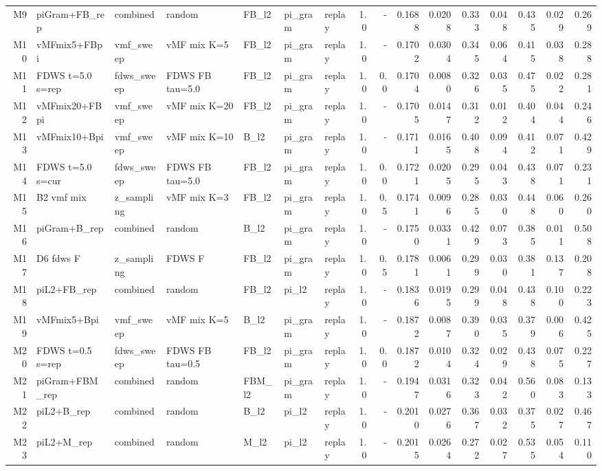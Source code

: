 \documentclass[10pt,landscape]{article}
\begin{document}
\begin{adjustbox}{max width=\textwidth}
\begin{tabular}{rl l l l l l r r rr rr rr r}
M9 & piGram+FB\_rep & combined & random & FB\_l2 & pi\_gram & replay & 1.0 & - & 0.1688 & 0.0208 & 0.333 & 0.048 & 0.435 & 0.029 & 0.269 \\
M10 & vMFmix5+FBpi & vmf\_sweep & vMF mix K=5 & FB\_l2 & pi\_gram & replay & 1.0 & - & 0.1702 & 0.0304 & 0.345 & 0.064 & 0.415 & 0.038 & 0.288 \\
M11 & FDWS t=5.0 s=rep & fdws\_sweep & FDWS FB tau=5.0 & FB\_l2 & pi\_gram & replay & 1.0 & 0.0 & 0.1704 & 0.0080 & 0.326 & 0.035 & 0.475 & 0.022 & 0.281 \\
M12 & vMFmix20+FBpi & vmf\_sweep & vMF mix K=20 & FB\_l2 & pi\_gram & replay & 1.0 & - & 0.1705 & 0.0147 & 0.312 & 0.012 & 0.404 & 0.044 & 0.246 \\
M13 & vMFmix10+Bpi & vmf\_sweep & vMF mix K=10 & B\_l2 & pi\_gram & replay & 1.0 & - & 0.1711 & 0.0165 & 0.408 & 0.094 & 0.412 & 0.071 & 0.429 \\
M14 & FDWS t=5.0 s=cur & fdws\_sweep & FDWS FB tau=5.0 & FB\_l2 & pi\_gram & replay & 1.0 & 0.0 & 0.1721 & 0.0205 & 0.295 & 0.043 & 0.438 & 0.071 & 0.231 \\
M15 & B2 vmf mix & z\_sampling & vMF mix K=3 & FB\_l2 & pi\_gram & replay & 1.0 & 0.5 & 0.1741 & 0.0096 & 0.285 & 0.030 & 0.448 & 0.060 & 0.260 \\
M16 & piGram+B\_rep & combined & random & B\_l2 & pi\_gram & replay & 1.0 & - & 0.1750 & 0.0331 & 0.429 & 0.073 & 0.385 & 0.011 & 0.508 \\
M17 & D6 fdws F & z\_sampling & FDWS F & FB\_l2 & pi\_gram & replay & 1.0 & 0.5 & 0.1781 & 0.0061 & 0.299 & 0.030 & 0.381 & 0.137 & 0.208 \\
M18 & piL2+FB\_rep & combined & random & FB\_l2 & pi\_l2 & replay & 1.0 & - & 0.1836 & 0.0195 & 0.299 & 0.048 & 0.438 & 0.100 & 0.223 \\
M19 & vMFmix5+Bpi & vmf\_sweep & vMF mix K=5 & B\_l2 & pi\_gram & replay & 1.0 & - & 0.1872 & 0.0087 & 0.390 & 0.035 & 0.379 & 0.006 & 0.425 \\
M20 & FDWS t=0.5 s=rep & fdws\_sweep & FDWS FB tau=0.5 & FB\_l2 & pi\_gram & replay & 1.0 & 0.0 & 0.1872 & 0.0104 & 0.324 & 0.029 & 0.438 & 0.075 & 0.227 \\
M21 & piGram+FBM\_rep & combined & random & FBM\_l2 & pi\_gram & replay & 1.0 & - & 0.1947 & 0.0316 & 0.323 & 0.042 & 0.560 & 0.083 & 0.133 \\
M22 & piL2+B\_rep & combined & random & B\_l2 & pi\_l2 & replay & 1.0 & - & 0.2010 & 0.0276 & 0.367 & 0.032 & 0.375 & 0.027 & 0.467 \\
M23 & piL2+M\_rep & combined & random & M\_l2 & pi\_l2 & replay & 1.0 & - & 0.2015 & 0.0264 & 0.272 & 0.027 & 0.535 & 0.054 & 0.110 \\

\end{tabular}
\end{adjustbox}
\end{document}
